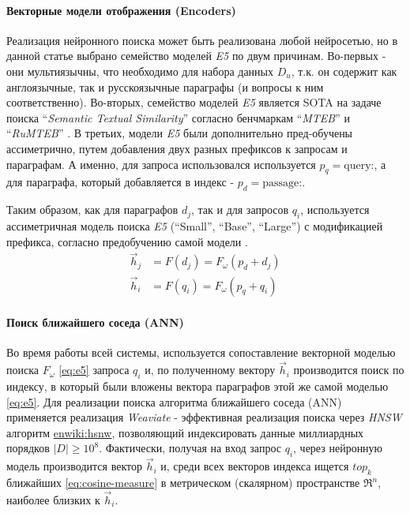 \paragraph{Векторные модели отображения (Encoders)}
Реализация нейронного поиска может быть реализована любой нейросетью, но в данной статье выбрано семейство моделей 
\textit{E5} \cite{e5} по двум причинам. Во-первых - они мультиязычны, что необходимо для набора данных $D_u$, т.к. он содержит как англоязычные, так и русскоязычные параграфы (и вопросы к ним соответственно).
Во-вторых, семейство моделей \textit{E5} является SOTA на задаче поиска ``\textit{Semantic Textual Similarity}'' согласно бенчмаркам ``\textit{MTEB}'' \cite{mteb} и ``\textit{RuMTEB}'' \cite{rumteb}.
В третьих, модели \textit{E5} были дополнительно пред-обучены ассиметрично, путем добавления двух разных префиксов к запросам и параграфам. А именно, для запроса использовался используется
$p_{q}=\text{query:}$, а для параграфа, который добавляется в индекс - $p_{d}=\text{passage:}$.

Таким образом, как для параграфов $d_j$, так и для запросов $q_i$, используется ассиметричная модель поиска \textit{E5} (``Small'', ``Base'', ``Large'') с модификацией префикса, согласно предобучению самой модели \cite{e5}.
\begin{align}
    \vec{h}_j&=F(d_j) = F_{\omega}(p_d + d_j) \\
    \vec{h}_i&=F(q_i) = F_{\omega}(p_q + q_i)
    \label{eq:e5}
\end{align}

\paragraph{Поиск ближайшего соседа (ANN)}
Во время работы всей системы, используется сопоставление векторной моделью поиска $F_{\omega}$ \eqref{eq:e5} запроса $q_i$ и, по полученному вектору $\vec{h}_i$ производится 
поиск по индексу, в который были вложены вектора параграфов этой же самой моделью \eqref{eq:e5}. Для реализации поиска алгоритма ближайшего соседа (ANN) применяется реализация 
\textit{Weaviate} \cite{weaviate} - эффективная реализация поиска через \textit{HNSW} алгоритм \url{enwiki:hsnw}, позволяющий индексировать 
данные миллиардных порядков $|D|\ge 10^8$. Фактически, получая на вход запрос $q_i$, через нейронную модель производится вектор $\vec{h}_i$ и, 
среди всех векторов индекса ищется $top_k$ ближайших \eqref{eq:cosine-measure} в метрическом (скалярном) пространстве $\Re^n$, наиболее близких к $\vec{h}_i$.

